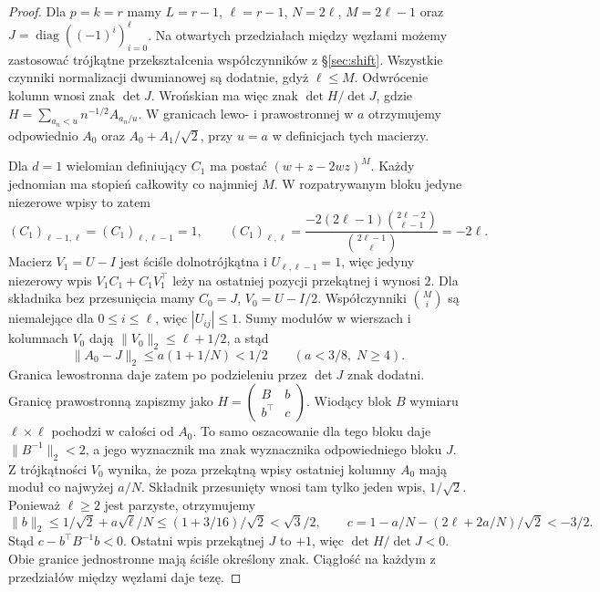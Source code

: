 \documentclass[11pt,a4paper,reqno]{amsart}
\numberwithin{equation}{section}
\begin{document}
\begin{proof}
Dla \(p=k=r\) mamy \(L=r-1\), \(\ell=r-1\), \(N=2\ell\), \(M=2\ell-1\) oraz \(J=\operatorname{diag}((-1)^i)_{i=0}^{\ell}\). Na otwartych przedziałach między węzłami możemy zastosować trójkątne przekształcenia współczynników z \S\ref{sec:shift}. Wszystkie czynniki normalizacji dwumianowej są dodatnie, gdyż \(\ell\le M\). Odwrócenie kolumn wnosi znak \(\det J\). Wrońskian ma więc znak \(\det H/\det J\), gdzie \(H=\sum_{a_n<u}n^{-1/2}A_{a_n/u}\). W granicach lewo- i prawostronnej w \(a\) otrzymujemy odpowiednio \(A_0\) oraz \(A_0+A_1/\sqrt2\), przy \(u=a\) w definicjach tych macierzy.

Dla \(d=1\) wielomian definiujący \(C_1\) ma postać \((w+z-2wz)^M\). Każdy jednomian ma stopień całkowity co najmniej \(M\). W rozpatrywanym bloku jedyne niezerowe wpisy to zatem
\[
 (C_1)_{\ell-1,\ell}=(C_1)_{\ell,\ell-1}=1,\qquad
 (C_1)_{\ell,\ell}=
 \frac{-2(2\ell-1)\binom{2\ell-2}{\ell-1}}{\binom{2\ell-1}{\ell}}=-2\ell .
\]
Macierz \(V_1=U-I\) jest ściśle dolnotrójkątna i \(U_{\ell,\ell-1}=1\), więc jedyny niezerowy wpis \(V_1 C_1+C_1V_1^\top\) leży na ostatniej pozycji przekątnej i wynosi \(2\). Dla składnika bez przesunięcia mamy \(C_0=J\), \(V_0=U-I/2\). Współczynniki \(\binom Mi\) są niemalejące dla \(0\le i\le\ell\), więc \(|U_{ij}|\le1\). Sumy modułów w wierszach i kolumnach \(V_0\) dają \(\|V_0\|_2\le\ell+1/2\), a stąd
\[
 \|A_0-J\|_2\le a(1+1/N)<1/2 \qquad (a<3/8,\;N\ge4).
\]
Granica lewostronna daje zatem po podzieleniu przez \(\det J\) znak dodatni. Granicę prawostronną zapiszmy jako \(H=\left(\begin{smallmatrix} B&b\\ b^\top&c\end{smallmatrix}\right)\). Wiodący blok \(B\) wymiaru \(\ell\times\ell\) pochodzi w całości od \(A_0\). To samo oszacowanie dla tego bloku daje \(\|B^{-1}\|_2<2\), a jego wyznacznik ma znak wyznacznika odpowiedniego bloku \(J\). Z trójkątności \(V_0\) wynika, że poza przekątną wpisy ostatniej kolumny \(A_0\) mają moduł co najwyżej \(a/N\). Składnik przesunięty wnosi tam tylko jeden wpis, \(1/\sqrt2\). Ponieważ \(\ell\ge2\) jest parzyste, otrzymujemy
\[
 \|b\|_2\le 1/\sqrt2+a\sqrt\ell/N\le (1+3/16)/\sqrt2<\sqrt3/2,
 \qquad
 c=1-a/N-(2\ell+2a/N)/\sqrt2<-3/2.
\]
Stąd \(c-b^\top B^{-1}b<0\). Ostatni wpis przekątnej \(J\) to \(+1\), więc \(\det H/\det J<0\). Obie granice jednostronne mają ściśle określony znak. Ciągłość na każdym z przedziałów między węzłami daje tezę.
\end{proof}
\end{document}
